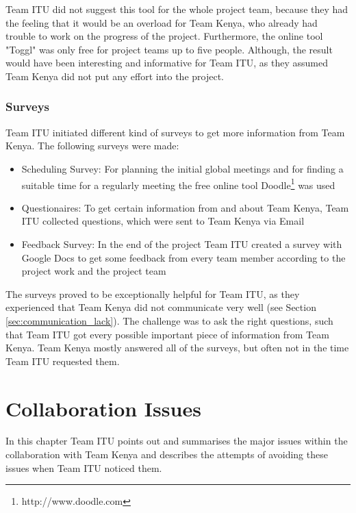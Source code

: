 Team ITU did not suggest this tool for the whole project team, because they had the feeling that it would be an overload for Team Kenya, who already had trouble to work on the progress of the project. Furthermore, the online tool "Toggl" was only free for project teams up to five people. Although, the result would have been interesting and informative for Team ITU, as they assumed Team Kenya did not put any effort into the project.


\subsubsection {Surveys}
\label{sec:surveys}
Team ITU initiated different kind of surveys to get more information from Team Kenya. The following surveys were made:
	\begin{itemize}
		\item Scheduling Survey: For planning the initial global meetings and for finding a suitable time for a regularly meeting the free online tool Doodle\footnote{http://www.doodle.com} was used
		\item Questionaires: To get certain information from and about Team Kenya, Team ITU collected questions, which were sent to Team Kenya via Email 
		\item Feedback Survey: In the end of the project Team ITU created a survey with Google Docs to get some feedback from every team member according to the project work and the project team
	\end{itemize}
The surveys proved to be exceptionally helpful for Team ITU, as they experienced that Team Kenya did not communicate very well (see Section \ref{sec:communication_lack}). The challenge was to ask the right questions, such that Team ITU got every possible important piece of information from Team Kenya. Team Kenya mostly answered all of the surveys, but often not in the time Team ITU requested them.



\section{Collaboration Issues}
\label{sec:issues}
In this chapter Team ITU points out and summarises the major issues within the collaboration with Team Kenya and describes the attempts of avoiding these issues when Team ITU noticed them.


